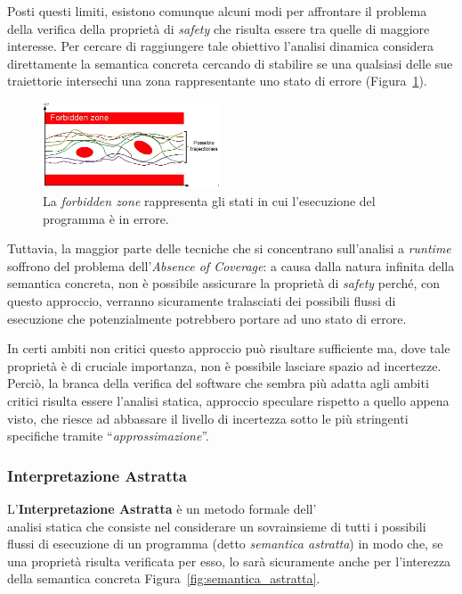 Posti questi limiti, esistono comunque alcuni modi per affrontare il problema della verifica della proprietà di \textit{safety} che risulta essere tra quelle di maggiore interesse.
Per cercare di raggiungere tale obiettivo l'analisi dinamica considera direttamente la semantica concreta cercando di stabilire se una qualsiasi delle sue traiettorie intersechi una zona rappresentante uno stato di errore (Figura~\ref{fig:forbidden_zone}).
\begin{figure}[ht]
    \centering
    \includegraphics[width=0.47\textwidth]{figures/forbidden_zone.png}
    \caption{La \textit{forbidden zone} rappresenta gli stati in cui l'esecuzione del programma è in errore.}
    \label{fig:forbidden_zone}
\end{figure}

Tuttavia, la maggior parte delle tecniche che si concentrano sull'analisi a \textit{runtime} soffrono del problema dell'\textit{Absence of Coverage}: a causa dalla natura infinita della semantica concreta, non è possibile assicurare la proprietà di \textit{safety} perché, con questo approccio, verranno sicuramente tralasciati dei possibili flussi di esecuzione che potenzialmente potrebbero portare ad uno stato di errore.

In certi ambiti non critici questo approccio può risultare sufficiente ma, dove tale proprietà è di cruciale importanza, non è possibile lasciare spazio ad incertezze.
Perciò, la branca della verifica del software che sembra più adatta agli ambiti critici risulta essere l'analisi statica, approccio speculare rispetto a quello appena visto, che riesce ad abbassare il livello di incertezza sotto le più stringenti specifiche tramite ``\textit{approssimazione}''.

\newpage

\subsubsection{Interpretazione Astratta}
L'\textbf{Interpretazione Astratta} \cite{AbsIntNutshell} è un metodo formale dell'\\analisi statica che consiste nel considerare un sovrainsieme di tutti i possibili flussi di esecuzione di un programma (detto \textit{semantica astratta}) in modo che, se una proprietà risulta verificata per esso, lo sarà sicuramente anche per l'interezza della semantica concreta Figura~\ref{fig:semantica_astratta}.

